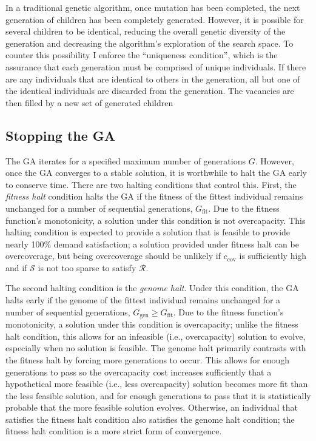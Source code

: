 \documentclass[12pt,dvipsnames]{report}
\begin{document}
In a traditional genetic algorithm, once mutation has been completed, the next generation of children has been completely generated.  However, it is possible for several children to be identical, reducing the overall genetic diversity of the generation and decreasing the algorithm's exploration of the search space.  To counter this possibility I enforce the ``uniqueness condition'', which is the assurance that each generation must be comprised of unique individuals.  If there are any individuals that are identical to others in the generation, all but one of the identical individuals are discarded from the generation.  The vacancies are then filled by a new set of generated children

\subsection{Stopping the GA} \label{subsec:ga_stop}

The GA iterates for a specified maximum number of generations $G$.  However, once the GA converges to a stable solution, it is worthwhile to halt the GA early to conserve time.  There are two halting conditions that control this.  First, the \emph{fitness halt} condition halts the GA if the fitness of the fittest individual remains unchanged for a number of sequential generations, $G_{\text{fit}}$.  Due to the fitness function's monotonicity, a solution under this condition is not overcapacity.  This halting condition is expected to provide a solution that is feasible to provide nearly 100\% demand satisfaction; a solution provided under fitness halt can be overcoverage, but being overcoverage should be unlikely if $c_{\text{cov}}$ is sufficiently high and if $\mathcal{S}$ is not too sparse to satisfy $\mathcal{R}$.

The second halting condition is the \emph{genome halt}.  Under this condition, the GA halts early if the genome of the fittest individual remains unchanged for a number of sequential generations, $G_{\text{gen}} \geq G_{\text{fit}}$.  Due to the fitness function's monotonicity, a solution under this condition is overcapacity; unlike the fitness halt condition, this allows for an infeasible (i.e., overcapacity) solution to evolve, especially when no solution is feasible.  The genome halt primarily contrasts with the fitness halt by forcing more generations to occur.  This allows for enough generations to pass so the overcapacity cost increases sufficiently that a hypothetical more feasible (i.e., less overcapacity) solution becomes more fit than the less feasible solution, and for enough generations to pass that it is statistically probable that the more feasible solution evolves.  Otherwise, an individual that satisfies the fitness halt condition also satisfies the genome halt condition; the fitness halt condition is a more strict form of convergence.
\end{document}
